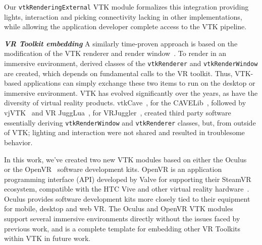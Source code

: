 Our \texttt{vtkRenderingExternal} VTK module formalizes this integration providing lights, interaction and picking connectivity lacking in other implementations, while allowing the application developer complete access to the VTK pipeline.

\textbf{\textit{VR Toolkit embedding}} A similarly time-proven approach is based on the modification of the VTK renderer and render window~\cite{van2000vista, Hannema:2001, Shamonin02vtkcave, Belleman:2003}. 
To render in an immersive environment, derived classes of the
\texttt{vtkRenderer} and \texttt{vtkRenderWindow} are created, which depends on fundamental calls to the VR toolkit.
Thus, VTK-based applications can simply exchange these two items to run on the desktop or immersive environment.
VTK has evolved significantly over the years, as have the diversity of virtual reality products.
vtkCave~\cite{Tufo:1999}, for the CAVELib~\cite{CAVELib:2016}, followed by
vjVTK~\cite{Blom:2006} and VR JuggLua~\cite{Pavlik:2012}, for
VRJuggler~\cite{Bierbaum:2001}, created third party software essentially
deriving \texttt{vtkRenderWindow} and \texttt{vtkRenderer} classes, but, from
outside of VTK; lighting and interaction were not shared and resulted in troublesome behavior.

In this work, we've created two new VTK modules based on either the Oculus~\cite{Oculus:2016} or the OpenVR~\cite{OpenVR:2016} software development kits.
OpenVR is an application programming interface (API) developed by Valve for supporting their SteamVR ecosystem, compatible with the HTC Vive and other virtual reality hardware~\cite{Road2VR:2015}. Oculus provides software development kits more closely tied to their equipment for mobile, desktop and web VR. The Oculus and OpenVR VTK modules support several immersive environments directly
without the issues faced by previous work, and is a complete template
for embedding other VR Toolkits within VTK in future work.

